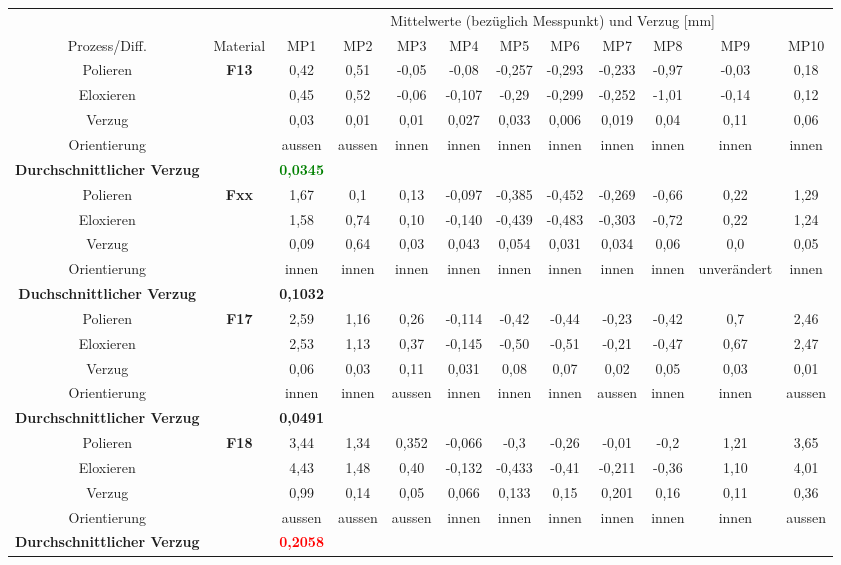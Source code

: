 \documentclass[12pt,a4paper,parskip,twoside,BCOR5mm,headsepline]{scrartcl}
\begin{document}
\begin{description*}
\begin{table}
\begin{tabular}{cccccccccccc}
\toprule
&& \multicolumn{10}{c}{Mittelwerte (bezüglich Messpunkt) und Verzug [\si{\milli\meter}]} \\
\cmidrule(2){3-12}
Prozess/Diff. & Material & MP1 & MP2 & MP3 & MP4 & MP5 & MP6 & MP7 & MP8 & MP9 & MP10 \\
\midrule
Polieren & \textbf{F13} & 0,42 & 0,51  & -0,05  & -0,08  & -0,257  & -0,293  &-0,233  &-0,97  & -0,03 &0,18  \\
Eloxieren &&0,45  &0,52  & -0,06 &-0,107  &-0,29  &-0,299  &-0,252  &-1,01  & -0,14 &0,12  \\
Verzug &&0,03  &0,01  &0,01  &0,027  &0,033  &0,006  &0,019 &0,04  &0,11  &0,06 \\
Orientierung &&aussen & aussen &innen & innen &innen & innen & innen & innen & innen &innen  \\
\textbf{Durchschnittlicher Verzug} &&\textbf{\textcolor{green}{0,0345}}&&&&&&&&&\\
\midrule
Polieren & \textbf{Fxx} &1,67  &0,1  & 0,13 &-0,097  & -0,385 &-0,452  &-0,269  &-0,66  &0,22  &1,29 \\
Eloxieren &&1,58  & 0,74 &0,10  &-0,140  &-0,439  &-0,483  &-0,303  & -0,72 & 0,22 &1,24  \\
Verzug && 0,09 & 0,64 &0,03  &0,043 &0,054  & 0,031  & 0,034&0,06  & 0,0 & 0,05  \\
Orientierung && innen &innen  & innen & innen &innen  &innen & innen &innen  & unverändert &innen  \\
\textbf{Duchschnittlicher Verzug} && \textbf{0,1032}&&&&&&&&&\\
\midrule
Polieren & \textbf{F17} &2,59  &1,16  & 0,26 &-0,114  &-0,42  & -0,44 &-0,23  &-0,42  &0,7  & 2,46 \\
Eloxieren &&2,53  &1,13  &0,37  &-0,145  &-0,50   &-0,51   &-0,21   &-0,47  & 0,67 &2,47   \\
Verzug && 0,06 &0,03  &0,11  & 0,031 &0,08  &0,07  &0,02   &0,05  &0,03  & 0,01 \\
Orientierung &&innen  & innen &aussen &innen  &innen  &innen  &aussen & innen &innen &aussen  \\
\textbf{Durchschnittlicher Verzug} && \textbf{0,0491} &&&&&&&&&\\
\midrule
Polieren & \textbf{F18} &3,44  & 1,34 &0,352  &-0,066  &-0,3  &-0,26  &-0,01  & -0,2 &1,21  & 3,65 \\
Eloxieren &&4,43  &1,48  &0,40  &-0,132  &-0,433  &-0,41  &-0,211  &-0,36  &1,10  &4,01  \\
Verzug &&0,99  & 0,14 &0,05 &0,066  &0,133  &0,15 & 0,201&0,16 &0,11  &0,36  \\
Orientierung && aussen&aussen  &aussen  & innen &innen  & innen &innen  & innen &innen  & aussen \\
\textbf{Durchschnittlicher Verzug} && \textbf{\textcolor{red}{0,2058}} &&&&&&&&&\\
\bottomrule


\end{tabular}
\end{table}
\end{description*}
\end{document}
